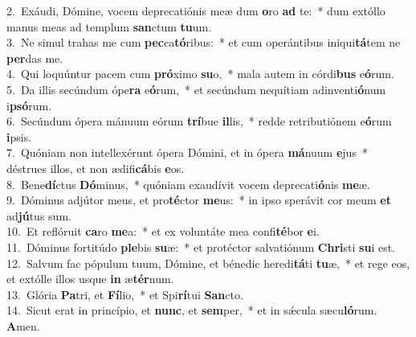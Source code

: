 {2.~}Exáudi, Dómine, vocem deprecatiónis meæ dum \textbf{o}ro \textbf{ad} te:~* dum extóllo manus meas ad templum \textbf{san}ctum \textbf{tu}um.\\
{3.~}Ne simul trahas me cum \textbf{pec}ca\textbf{tó}ribus:~* et cum operántibus iniqui\textbf{tá}tem ne \textbf{per}das me.\\
{4.~}Qui loquúntur pacem cum \textbf{pró}ximo \textbf{su}o,~* mala autem in córdi\textbf{bus} e\textbf{ó}rum.\\
{5.~}Da illis secúndum ópe\textbf{ra} e\textbf{ó}rum,~* et secúndum nequítiam adinventi\textbf{ó}num i\textbf{psó}rum.\\
{6.~}Secúndum ópera mánuum eórum \textbf{trí}bue \textbf{il}lis,~* redde retributiónem e\textbf{ó}rum \textbf{i}psis.\\
{7.~}Quóniam non intellexérunt ópera Dómini, et in ópera \textbf{má}nuum \textbf{e}jus~* déstrues illos, et non ædifi\textbf{cá}bis \textbf{e}os.\\
{8.~}Bene\textbf{dí}ctus \textbf{Dó}minus,~* quóniam exaudívit vocem deprecati\textbf{ó}nis \textbf{me}æ.\\
{9.~}Dóminus adjútor meus, et pro\textbf{té}ctor \textbf{me}us:~* in ipso sperávit cor meum \textbf{et} ad\textbf{jú}tus sum.\\
{10.~}Et reflóruit \textbf{ca}ro \textbf{me}a:~* et ex voluntáte mea confi\textbf{té}bor \textbf{e}i.\\
{11.~}Dóminus fortitúdo \textbf{ple}bis \textbf{su}æ:~* et protéctor salvatiónum \textbf{Chri}sti \textbf{su}i est.\\
{12.~}Salvum fac pópulum tuum, Dómine, et bénedic heredi\textbf{tá}ti \textbf{tu}æ,~* et rege eos, et extólle illos usque \textbf{in} æ\textbf{tér}num.\\
{13.~}Glória \textbf{Pa}tri, et \textbf{Fí}lio,~* et Spi\textbf{rí}tui \textbf{San}cto.\\
{14.~}Sicut erat in princípio, et \textbf{nunc}, et \textbf{sem}per,~* et in sǽcula sæcu\textbf{ló}rum. \textbf{A}men.\\
